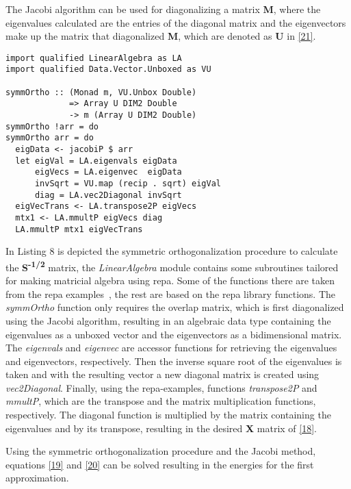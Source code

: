 \documentclass{tmr}
\begin{document}
\par The Jacobi algorithm can be used for diagonalizing a matrix \textbf{M},
where the eigenvalues calculated are the entries of the diagonal matrix
and the eigenvectors make up the matrix that diagonalized \textbf{M},
which are denoted as \textbf{U} in \eqref{21}. 

\begin{lstlisting}[float,captionpos=b,belowcaptionskip=4pt, caption= Symmetric Orthogonalization]
import qualified LinearAlgebra as LA
import qualified Data.Vector.Unboxed as VU

symmOrtho :: (Monad m, VU.Unbox Double) 
             => Array U DIM2 Double 
             -> m (Array U DIM2 Double)
symmOrtho !arr = do
symmOrtho arr = do
  eigData <- jacobiP $ arr
  let eigVal = LA.eigenvals eigData
      eigVecs = LA.eigenvec  eigData
      invSqrt = VU.map (recip . sqrt) eigVal
      diag = LA.vec2Diagonal invSqrt
  eigVecTrans <- LA.transpose2P eigVecs
  mtx1 <- LA.mmultP eigVecs diag
  LA.mmultP mtx1 eigVecTrans
\end{lstlisting}

In Listing 8 is depicted the symmetric orthogonalization procedure to calculate
the \textbf{S\textsuperscript{-1/2}} matrix, the \textit{LinearAlgebra} module 
contains some subroutines tailored for making matricial algebra using repa.
 Some of the functions there are taken from the repa examples~\cite{repaExam},
the rest are based on the repa library functions. The \textit{symmOrtho} 
function only requires the overlap matrix, which is first diagonalized using 
the Jacobi algorithm, resulting in an algebraic data type containing the eigenvalues
 as a unboxed vector and the eigenvectors  as a bidimensional matrix. The \textit{eigenvals} 
and \textit{eigenvec} are accessor functions
for retrieving the eigenvalues and eigenvectors, respectively.
Then the inverse square root of the eigenvalues is taken and with the resulting vector
a new diagonal matrix is created using \textit{vec2Diagonal}. Finally, using
the repa-examples, functions \textit{transpose2P} and \textit{mmultP}, which are 
the transpose and the matrix multiplication functions, respectively. The diagonal
function is multiplied by the matrix containing the eigenvalues and by its transpose,
resulting in the desired \textbf{X} matrix of \eqref{18}.

Using the symmetric orthogonalization procedure and the Jacobi method, equations \eqref{19}
and \eqref{20} can be solved resulting in the energies for the first approximation.
\end{document}
